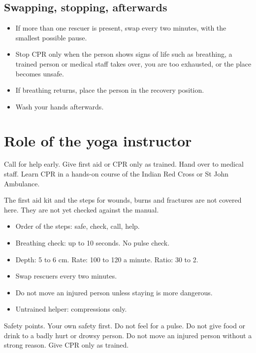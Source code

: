 \subsection*{Swapping, stopping, afterwards}

\begin{itemize}
\item If more than one rescuer is present, swap every two minutes, with the smallest possible pause.
\item Stop CPR only when the person shows signs of life such as breathing, a trained person or medical staff takes over, you are too exhausted, or the place becomes unsafe.
\item If breathing returns, place the person in the recovery position.
\item Wash your hands afterwards.
\end{itemize}

\section*{Role of the yoga instructor}

Call for help early. Give first aid or CPR only as trained. Hand over to medical staff. Learn CPR in a hands-on course of the Indian Red Cross or St John Ambulance.

The first aid kit and the steps for wounds, burns and fractures are not covered here. They are not yet checked against the manual.

\begin{recall}
\begin{itemize}
\item Order of the steps: safe, check, call, help.
\item Breathing check: up to 10 seconds. No pulse check.
\item Depth: 5 to 6 cm. Rate: 100 to 120 a minute. Ratio: 30 to 2.
\item Swap rescuers every two minutes.
\item Do not move an injured person unless staying is more dangerous.
\item Untrained helper: compressions only.
\end{itemize}
\end{recall}

\begin{caution}
Safety points. Your own safety first. Do not feel for a pulse. Do not give food or drink to a badly hurt or drowsy person. Do not move an injured person without a strong reason. Give CPR only as trained.
\end{caution}

